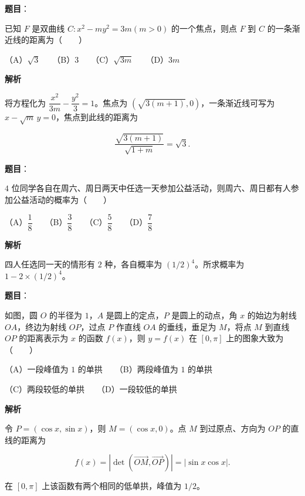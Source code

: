 \begin{answer}

\textbf{题目}：

已知 $F$ 是双曲线 $C:x^2-my^2=3m (m>0)$ 的一个焦点，则点 $F$ 到 $C$ 的一条渐近线的距离为\mbox{（　　）}

（A）$\sqrt3$　　（B）$3$　　（C）$\sqrt{3m}$　　（D）$3m$

\textbf{解析}

将方程化为 $\dfrac{x^2}{3m}-\dfrac{y^2}{3}=1$。焦点为 $(\sqrt{3(m+1)},0)$，一条渐近线可写为 $x-\sqrt m\,y=0$，焦点到此线的距离为

\nopagebreak[4]
\[
\frac{\sqrt{3(m+1)}}{\sqrt{1+m}}=\sqrt3.
\]


\end{answer}
\begin{answer}

\textbf{题目}：

$4$ 位同学各自在周六、周日两天中任选一天参加公益活动，则周六、周日都有人参加公益活动的概率为\mbox{（　　）}

（A）$\dfrac18$　　（B）$\dfrac38$　　（C）$\dfrac58$　　（D）$\dfrac78$

\textbf{解析}

四人任选同一天的情形有 $2$ 种，各自概率为 $(1/2)^4$。所求概率为 $1-2\times(1/2)^4$。


\end{answer}
\begin{answer}

\textbf{题目}：

如图，圆 $O$ 的半径为 $1$，$A$ 是圆上的定点，$P$ 是圆上的动点，角 $x$ 的始边为射线 $OA$，终边为射线 $OP$，过点 $P$ 作直线 $OA$ 的垂线，垂足为 $M$，将点 $M$ 到直线 $OP$ 的距离表示为 $x$ 的函数 $f(x)$，则 $y=f(x)$ 在 $[0,\pi]$ 上的图象大致为\mbox{（　　）}
\nopagebreak[4]
\begin{center}\end{center}
\nopagebreak[4]
（A）一段峰值为 $1$ 的单拱　　（B）两段峰值为 $1$ 的单拱

（C）两段较低的单拱　　（D）一段较低的单拱

\textbf{解析}

令 $P=(\cos x,\sin x)$，则 $M=(\cos x,0)$。点 $M$ 到过原点、方向为 $OP$ 的直线的距离为

\nopagebreak[4]
\[
f(x)=|\det(\overrightarrow{OM},\overrightarrow{OP})|=|\sin x\cos x|.
\]

在 $[0,\pi]$ 上该函数有两个相同的低单拱，峰值为 $1/2$。


\end{answer}
